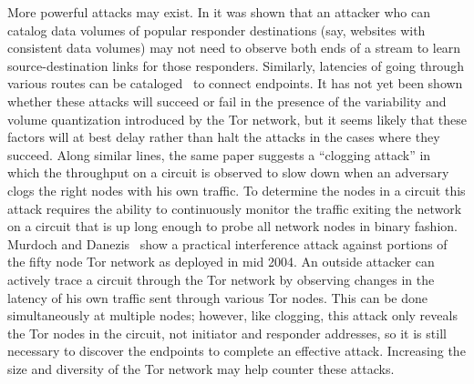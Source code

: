 \documentclass{llncs}
\begin{document}
More powerful attacks may exist. In \cite{hintz-pet02} it was
shown that an attacker who can catalog data volumes of popular
responder destinations (say, websites with consistent data volumes) may not
need to
observe both ends of a stream to learn source-destination links for those
responders.
Similarly, latencies of going through various routes can be
cataloged~\cite{back01} to connect endpoints.
It has not yet been shown whether these attacks will succeed or fail
in the presence of the variability and volume quantization introduced by the
Tor network, but it seems likely that these factors will at best delay
rather than halt the attacks in the cases where they succeed.
Along similar lines, the same paper suggests a ``clogging
attack'' in which the throughput on a circuit is observed to slow
down when an adversary clogs the right nodes with his own traffic.
To determine the nodes in a circuit this attack requires the ability
to continuously monitor the traffic exiting the network on a circuit
that is up long enough to probe all network nodes in binary fashion.
Murdoch and Danezis~\cite{attack-tor-oak05} show a practical
interference attack against portions of
the fifty node Tor network as deployed in mid 2004.
An outside attacker can actively trace a circuit through the Tor network
by observing changes in the latency of his
own traffic sent through various Tor nodes. This can be done
simultaneously at multiple nodes; however, like clogging,
this attack only reveals
the Tor nodes in the circuit, not initiator and responder addresses,
so it is still necessary to discover the endpoints to complete an
effective attack. Increasing the size and diversity of the Tor network may
help counter these attacks.

%
\end{document}
